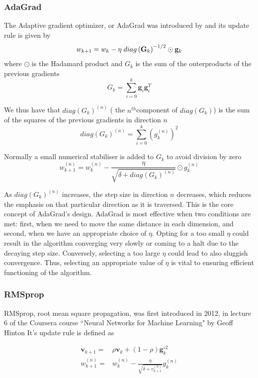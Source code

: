 \documentclass{article}
\theoremstyle{definition}
\begin{document}
\subsubsection{AdaGrad}
The Adaptive gradient optimizer, or AdaGrad was introduced by \textcite{duchi2011adaptive} and its update rule is given by
\begin{equation*}
    w_{k+1}= w_{k}-\eta \hspace{1mm} diag\left(\mathbf{G}_{k}\right)^{-1/2} \odot \mathbf{g}_k 
\end{equation*}
where $\odot$ is the Hadamard product and $G_k$ is the sum of the outerproducts of the previous gradients
\begin{equation*}
    G_k = \sum_{i = 0}^k \mathbf{g}_i \mathbf{g}_i^T
\end{equation*}

 We thus have that $diag\left(G_{k}\right)^{(n)}$ ( the $n^{th}$component of $diag\left(G_k\right)$) is the sum of the squares of the previous gradients in direction $n$
 \[
 diag\left(G_{k}\right)^{(n)} = \sum_{i=0}^k  \left(g_k^{(n)}\right)^2 
 \]

 Normally a small numerical stabiliser is added to $G_k$ to avoid division by zero
 \[
 w_{k+1}^{(n)}= w_{k}^{(n)}- \frac{\eta}{ \sqrt{\delta+diag\left(G_{k}\right)^{(n)}}} \odot g_k^{(n)}
 \]
 

As $diag\left(G_k\right)^{(n)}$ increases, the step size in direction $n$ decreases, which reduces the emphasis on that particular direction as it is traversed. This is the core concept of AdaGrad's design. AdaGrad is most effective when two conditions are met: first, when we need to move the same distance in each dimension, and second, when we have an appropriate choice of $\eta$. Opting for a too small $\eta$ could result in the algorithm converging very slowly or coming to a halt due to the decaying step size. Conversely, selecting a too large $\eta$ could lead to also sluggish convergence. Thus, selecting an appropriate value of $\eta$ is vital to ensuring efficient functioning of the algorithm. 


\subsubsection{RMSprop}
RMSprop, root mean square propagation, was first introduced in 2012, in lecture 6 of the Coursera course ``Neural Networks for Machine Learning" by Geoff Hinton
\parencite{NNforML-Lecture6} It's update rule is defined as 

\begin{align*}
    \mathbf{v}_{k+1} =& \rho \mathbf{v}_{k} + (1-\rho) \mathbf{g}_k^{\circ 2}\\
    w_{k+1}^{(n)} =& w_k^{(n)} - \frac{\eta}{  \sqrt{\delta + v_{k+1}^{(n)}}} g_k^{(n)}
\end{align*}
\end{document}
